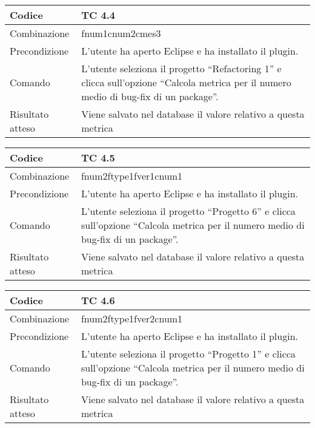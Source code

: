 \begin{table}[ht]
\begin{tabular}{|p{3cm}|p{9cm}|}
\hline
\cellcolor{lightgray}Codice				& TC 4.4								\\
\hline
\cellcolor{lightgray}Combinazione		& fnum1cnum2cmes3								\\
\hline
\cellcolor{lightgray}Precondizione		& L'utente ha aperto Eclipse e ha installato il plugin.			\\
\hline
\cellcolor{lightgray}Comando			& L'utente seleziona il progetto ``Refactoring 1''  e clicca sull'opzione ``Calcola metrica per il numero medio di bug-fix di un package''.	\\
\hline
\cellcolor{lightgray}Risultato atteso	& Viene salvato nel database il valore relativo a questa metrica	\\
\hline
\end{tabular}
\end{table}

\begin{table}[ht]
\begin{tabular}{|p{3cm}|p{9cm}|}
\hline
\cellcolor{lightgray}Codice				& TC 4.5								\\
\hline
\cellcolor{lightgray}Combinazione		& fnum2ftype1fver1cnum1 									\\
\hline
\cellcolor{lightgray}Precondizione		& L'utente ha aperto Eclipse e ha installato il plugin.			\\
\hline
\cellcolor{lightgray}Comando			& L'utente seleziona il progetto ``Progetto 6''  e clicca sull'opzione ``Calcola metrica per il numero medio di bug-fix di un package''.	\\
\hline
\cellcolor{lightgray}Risultato atteso	& Viene salvato nel database il valore relativo a questa metrica	\\
\hline
\end{tabular}
\end{table}

\begin{table}[ht]
\begin{tabular}{|p{3cm}|p{9cm}|}
\hline
\cellcolor{lightgray}Codice				& TC 4.6								\\
\hline
\cellcolor{lightgray}Combinazione		& fnum2ftype1fver2cnum1								\\
\hline
\cellcolor{lightgray}Precondizione		& L'utente ha aperto Eclipse e ha installato il plugin.				\\
\hline
\cellcolor{lightgray}Comando			& L'utente seleziona il progetto ``Progetto 1''  e clicca sull'opzione ``Calcola metrica per il numero medio di bug-fix di un package''.	\\
\hline
\cellcolor{lightgray}Risultato atteso	& Viene salvato nel database il valore relativo a questa metrica	\\
\hline
\end{tabular}
\end{table}

